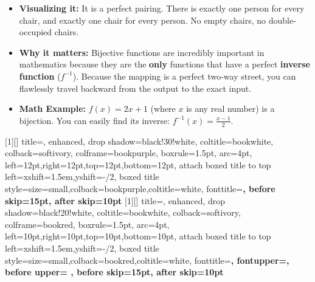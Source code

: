 \documentclass[12pt]{article}
\begin{document}
\begin{center}
\end{center}

\begin{itemize}[leftmargin=*]
  \item \textbf{Visualizing it:} It is a perfect pairing. There is exactly one person for every chair, and exactly one chair for every person. No empty chairs, no double-occupied chairs. 
  \item \textbf{Why it matters:} Bijective functions are incredibly important in mathematics because they are the \textbf{only} functions that have a perfect \textbf{inverse function} ($f^{-1}$). Because the mapping is a perfect two-way street, you can flawlessly travel backward from the output to the exact input. 
  \item \textbf{Math Example:} $f(x) = 2x + 1$ (where $x$ is any real number) is a bijection. You can easily find its inverse: $f^{-1}(x) = \frac{x - 1}{2}$.
\end{itemize}

[1][]
{
  title={\bfseries {}},
  enhanced,
  drop shadow={black!30!white},
  coltitle=bookwhite,
  colback=softivory,
  colframe=bookpurple,
  boxrule=1.5pt,
  arc=4pt,
  left=12pt,right=12pt,top=12pt,bottom=12pt,
  attach boxed title to top left={xshift=1.5em,yshift=-\tcboxedtitleheight/2},
  boxed title style={size=small,colback=bookpurple,coltitle=white},
  fonttitle=\bfseries,
  before skip=15pt,
  after skip=10pt
}
[1][]
{
  title={\bfseries {}},
  enhanced,
  drop shadow={black!20!white},
  coltitle=bookwhite,
  colback=softivory,
  colframe=bookred,
  boxrule=1.5pt,
  arc=4pt,
  left=10pt,right=10pt,top=10pt,bottom=10pt,
  attach boxed title to top left={xshift=1.5em,yshift=-\tcboxedtitleheight/2},
  boxed title style={size=small,colback=bookred,coltitle=white},
  fonttitle=\bfseries,
  fontupper=\footnotesize,
  before upper={
    \setlength{\abovedisplayskip}{4pt}%
    \setlength{\belowdisplayskip}{4pt}%
    \setlength{\abovedisplayshortskip}{3pt}%
    \setlength{\belowdisplayshortskip}{3pt}%
    \setlength{\jot}{2pt}%
  },
  before skip=15pt,
  after skip=10pt
}
\end{document}
